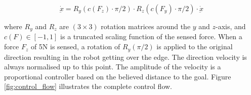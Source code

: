 \documentclass[final,3p,times,twocolumn]{elsarticle}
\newcommand{\Param}{\boldsymbol{\theta}}
\begin{document}
\begin{equation}
  \dot{\underbar{x}} = R_y(c(F_z) \cdot \pi/2) \cdot R_z(c(F_y) \cdot \pi/2) \cdot \dot{\underbar{x}} \label{eq:modulation}
\end{equation}

where $R_y$ and $R_z$ are $(3 \times 3)$ rotation matrices around the $y$ and $z$-axis, and $c(F) \in [-1,1]$ is a truncated scaling function of the sensed 
force.  When a force $F_z$ of 5N is sensed, a rotation of $R_y(\pi/2)$ is applied to the original direction resulting in the robot
getting over the edge. The direction velocity is always normalised up to this point. The amplitude of the velocity is a proportional
controller based on the believed distance to the goal. Figure \ref{fig:control_flow} illustrates the complete control flow.



\end{document}
